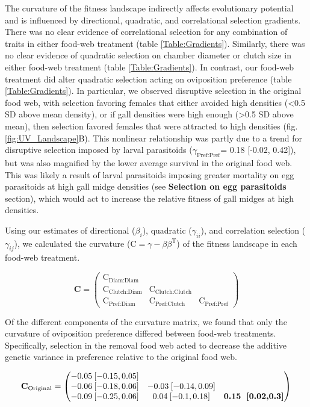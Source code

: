 \documentclass[11pt,]{article}
\begin{document}
\indent The curvature of the fitness landscape indirectly affects
evolutionary potential and is influenced by directional, quadratic, and
correlational selection gradients. There was no clear evidence of
correlational selection for any combination of traits in either food-web
treatment (table \ref{Table:Gradients}). Similarly, there was no clear
evidence of quadratic selection on chamber diameter or clutch size in
either food-web treatment (table \ref{Table:Gradients}). In contrast,
our food-web treatment did alter quadratic selection acting on
oviposition preference (table \ref{Table:Gradients}). In particular, we
observed disruptive selection in the original food web, with selection
favoring females that either avoided high densities (\textless{}0.5 SD
above mean density), or if gall densities were high enough
(\textgreater{}0.5 SD above mean), then selection favored females that
were attracted to high densities (fig. \ref{fig:UV_Landscape}B). This
nonlinear relationship was partly due to a trend for disruptive
selection imposed by larval parasitoids (\(\gamma_{\text{Pref:Pref}}\)=
0.18 {[}-0.02, 0.42{]}), but was also magnified by the lower average
survival in the original food web. This was likely a result of larval
parasitoids imposing greater mortality on egg parasitoids at high gall
midge densities (see \textbf{Selection on egg parasitoids} section),
which would act to increase the relative fitness of gall midges at high
densities.

Using our estimates of directional (\(\beta_i\)), quadratic
(\(\gamma_{ii}\)), and correlation selection (\(\gamma_{ij}\)), we
calculated the curvature (\(\text{C}=\gamma - \beta \beta^\text{T}\)) of
the fitness landscape in each food-web treatment.

\[\textbf{C} = \begin{pmatrix} \text{C}_{\text{Diam:Diam}}&& \\ \text{C}_{\text{Clutch:Diam}} & \text{C}_{\text{Clutch:Clutch}} & \\ \text{C}_{\text{Pref:Diam}} & \text{C}_{\text{Pref:Clutch}} & \text{C}_{\text{Pref:Pref}} \end{pmatrix}\]

Of the different components of the curvature matrix, we found that only
the curvature of oviposition preference differed between food-web
treatments. Specifically, selection in the removal food web acted to
decrease the additive genetic variance in preference relative to the
original food web.

\[\textbf{C}_{\text{Original}} = \begin{pmatrix} 
-0.05\: [-0.15,0.05] &  &  \\  
-0.06\: [-0.18,0.06] & -0.03\: [-0.14,0.09] &  \\  
-0.09\: [-0.25,0.06] & 0.04\: [-0.1,0.18] & \textbf{0.15\: [0.02,0.3]} \end{pmatrix}\]
\end{document}
